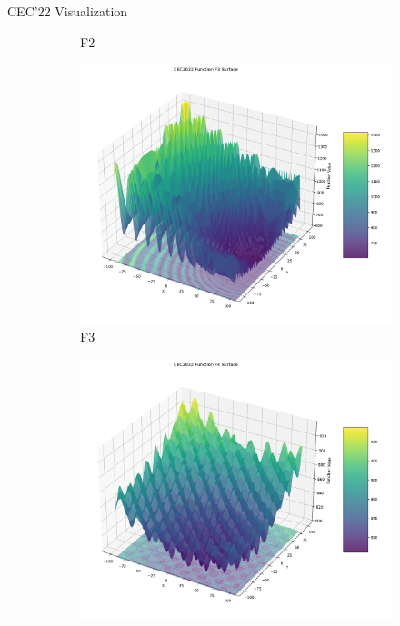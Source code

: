 \documentclass[aspectratio=169]{beamer}
\begin{document}
\begin{frame}{CEC'22 Visualization}
\begin{figure}
\begin{subfigure}[b]{0.19\textwidth}
            \caption*{F2}
        \end{subfigure}
        \hfill
        \begin{subfigure}[b]{0.19\textwidth}
            \includegraphics[width=\textwidth]{../plots/cec_bench/function_surface_f3.png}
            \caption*{F3}
        \end{subfigure}
        \hfill
        \begin{subfigure}[b]{0.19\textwidth}
            \includegraphics[width=\textwidth]{../plots/cec_bench/function_surface_f4.png}

\end{subfigure}
\end{figure}
\end{frame}
\end{document}
